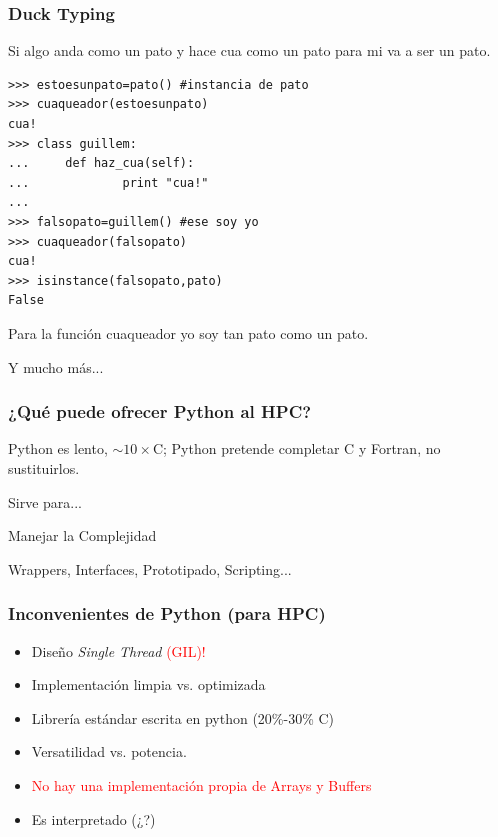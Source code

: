 \documentclass{beamer}
\begin{document}
\begin{frame}[containsverbatim]
 \frametitle{Duck Typing}
Si algo anda como un pato y hace cua como un pato para mi va a ser un pato.
\begin{verbatim}
>>> estoesunpato=pato() #instancia de pato
>>> cuaqueador(estoesunpato)
cua!
>>> class guillem:
...     def haz_cua(self):
...             print "cua!"
...
>>> falsopato=guillem() #ese soy yo
>>> cuaqueador(falsopato)
cua!
>>> isinstance(falsopato,pato)
False
\end{verbatim}
Para la función cuaqueador yo soy tan pato como un pato.
\end{frame}

\begin{frame}
 \begin{center}
 \begin{Huge}
  Y mucho más...
 \end{Huge}
\end{center}
\end{frame}


\begin{frame}
 \frametitle{¿Qué puede ofrecer Python al HPC?}
Python es lento, $\sim 10 \times$C; Python pretende completar C y Fortran, no sustituirlos.
\vspace{1cm}
\begin{center}
Sirve para...\\
\vspace{1cm}
 \begin{Huge}
  Manejar la Complejidad
 \end{Huge} 
\end{center}
Wrappers, Interfaces, Prototipado, Scripting...
\end{frame}

\begin{frame}
 \frametitle{Inconvenientes de Python (para HPC)}
\begin{itemize}
 \item Diseño \emph{Single Thread} \textcolor{red}{(GIL)!}
 \item Implementación limpia vs. optimizada
 \item Librería estándar escrita en python (20\%-30\%  C)
 \item Versatilidad vs. potencia.
 \item \textcolor{red}{No hay una implementación propia de Arrays y Buffers}
 \item Es interpretado (¿?)
\end{itemize}
\end{frame}
\end{document}
